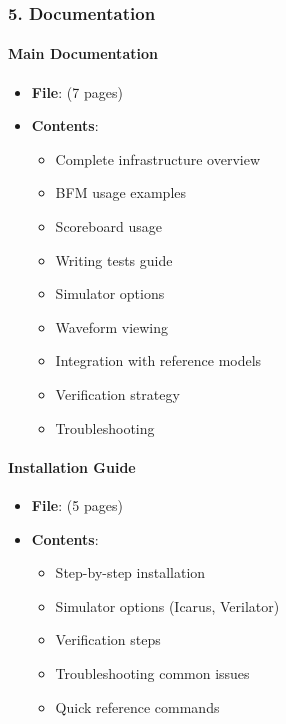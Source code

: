 \subsubsection{5. Documentation}\label{cr:app:archive-cocotb-setup-summary:5-documentation}

\paragraph{Main Documentation}\label{cr:app:archive-cocotb-setup-summary:main-documentation}

\begin{record}

\begin{itemize}
\tightlist
\item
  \textbf{File}:  (7 pages)
\item
  \textbf{Contents}:

  \begin{itemize}
  \tightlist
  \item
    Complete infrastructure overview
  \item
    BFM usage examples
  \item
    Scoreboard usage
  \item
    Writing tests guide
  \item
    Simulator options
  \item
    Waveform viewing
  \item
    Integration with reference models
  \item
    Verification strategy
  \item
    Troubleshooting
  \end{itemize}
\end{itemize}

\end{record}

\paragraph{Installation Guide}\label{cr:app:archive-cocotb-setup-summary:installation-guide}

\begin{record}

\begin{itemize}
\tightlist
\item
  \textbf{File}:  (5 pages)
\item
  \textbf{Contents}:

  \begin{itemize}
  \tightlist
  \item
    Step-by-step installation
  \item
    Simulator options (Icarus, Verilator)
  \item
    Verification steps
  \item
    Troubleshooting common issues
  \item
    Quick reference commands
  \end{itemize}
\end{itemize}

\end{record}

